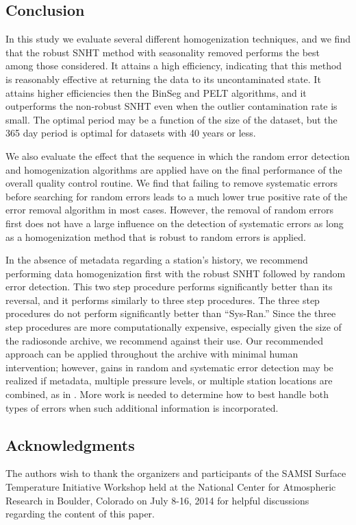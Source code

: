 \documentclass[12pt]{article}
\begin{document}
\begin{doublespacing}
\section{Conclusion}

In this study we evaluate several different homogenization techniques, and we find that the robust SNHT method with seasonality removed performs the best among those considered.  It attains a high efficiency, indicating that this method is reasonably effective at returning the data to its uncontaminated state.  It attains higher efficiencies then the BinSeg and PELT algorithms, and it outperforms the non-robust SNHT even when the outlier contamination rate is small.  The optimal period may be a function of the size of the dataset, but the 365 day period is optimal for datasets with 40 years or less.

We also evaluate the effect that the sequence in which the random error detection and homogenization algorithms are applied have on the final performance of the overall quality control routine.  We find that failing to remove systematic errors before searching for random errors leads to a much lower true positive rate of the error removal algorithm in most cases.  However,  the removal of random errors first does not have a large influence on the detection of systematic errors as long as a homogenization method that is robust to random errors is applied.

In the absence of metadata regarding a station's history, we recommend performing data homogenization first with the robust SNHT followed by random error detection.  This two step procedure performs significantly better than its reversal, and it performs similarly to three step procedures.  The three step procedures do not perform significantly better than ``Sys-Ran.''  Since the three step procedures are more computationally expensive, especially given the size of the radiosonde archive, we recommend against their use.  Our recommended approach can be applied throughout the archive with minimal human intervention;   however, gains in random and systematic error detection may be realized if metadata, multiple pressure levels, or multiple station locations are combined, as in \cite{ignaccolo14}.  More work is needed to determine how to best handle both types of errors  when such additional information is incorporated.   

\subsection*{Acknowledgments} The authors wish to thank the organizers and participants of the SAMSI Surface Temperature Initiative Workshop held at the National Center for Atmospheric Research in Boulder, Colorado on July 8-16, 2014 for helpful discussions regarding the content of this paper.

\end{doublespacing}
\end{document}
